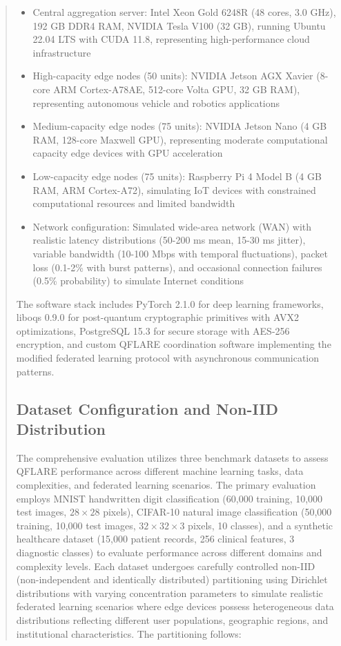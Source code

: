 \documentclass{svproc}
\begin{document}
\begin{abstract}
\begin{itemize}
    \item Central aggregation server: Intel Xeon Gold 6248R (48 cores, 3.0 GHz), 192 GB DDR4 RAM, NVIDIA Tesla V100 (32 GB), running Ubuntu 22.04 LTS with CUDA 11.8, representing high-performance cloud infrastructure
    \item High-capacity edge nodes (50 units): NVIDIA Jetson AGX Xavier (8-core ARM Cortex-A78AE, 512-core Volta GPU, 32 GB RAM), representing autonomous vehicle and robotics applications
    \item Medium-capacity edge nodes (75 units): NVIDIA Jetson Nano (4 GB RAM, 128-core Maxwell GPU), representing moderate computational capacity edge devices with GPU acceleration
    \item Low-capacity edge nodes (75 units): Raspberry Pi 4 Model B (4 GB RAM, ARM Cortex-A72), simulating IoT devices with constrained computational resources and limited bandwidth
    \item Network configuration: Simulated wide-area network (WAN) with realistic latency distributions (50-200 ms mean, 15-30 ms jitter), variable bandwidth (10-100 Mbps with temporal fluctuations), packet loss (0.1-2\% with burst patterns), and occasional connection failures (0.5\% probability) to simulate Internet conditions
\end{itemize}

The software stack includes PyTorch 2.1.0 for deep learning frameworks, liboqs 0.9.0 for post-quantum cryptographic primitives with AVX2 optimizations, PostgreSQL 15.3 for secure storage with AES-256 encryption, and custom QFLARE coordination software implementing the modified federated learning protocol with asynchronous communication patterns.

\subsection{Dataset Configuration and Non-IID Distribution}

The comprehensive evaluation utilizes three benchmark datasets to assess QFLARE performance across different machine learning tasks, data complexities, and federated learning scenarios. The primary evaluation employs MNIST handwritten digit classification (60,000 training, 10,000 test images, $28 \times 28$ pixels), CIFAR-10 natural image classification (50,000 training, 10,000 test images, $32 \times 32 \times 3$ pixels, 10 classes), and a synthetic healthcare dataset (15,000 patient records, 256 clinical features, 3 diagnostic classes) to evaluate performance across different domains and complexity levels. Each dataset undergoes carefully controlled non-IID (non-independent and identically distributed) partitioning using Dirichlet distributions with varying concentration parameters to simulate realistic federated learning scenarios where edge devices possess heterogeneous data distributions reflecting different user populations, geographic regions, and institutional characteristics. The partitioning follows:


\end{abstract}
\end{document}
